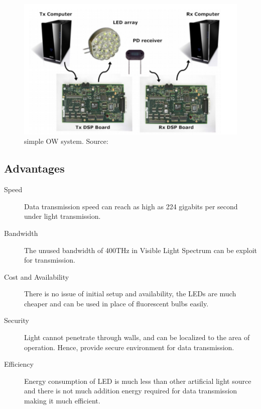 \documentclass{article}
\begin{document}
\begin{figure}[!h]
  \includegraphics[width=\linewidth]{res/hardware_li_fi.PNG}
    \caption{simple OW system. Source: \parencite{elgala09}}
  \label{fig:hardware_li_fi}
\end{figure}




\subsection{Advantages}

\begin{description}
    
    \item [Speed] Data transmission speed can reach as high as 224 gigabits per
        second under light transmission.

    \item [Bandwidth] The unused bandwidth of 400THz in Visible Light Spectrum
        can be exploit for transmission. 

    \item [Cost and Availability]  There is no issue of initial setup and
        availability, the LEDs are much cheaper and can be used in place of
        fluorescent bulbs easily.
    
    \item [Security]  Light cannot penetrate through walls, and can be
        localized to the area of operation. Hence, provide secure environment
        for data transmission.
    
    \item [Efficiency] Energy consumption of LED is much less than other
        artificial light source and there is not much addition energy required
        for data transmission making it much efficient.
    
\end{description}
\end{document}
